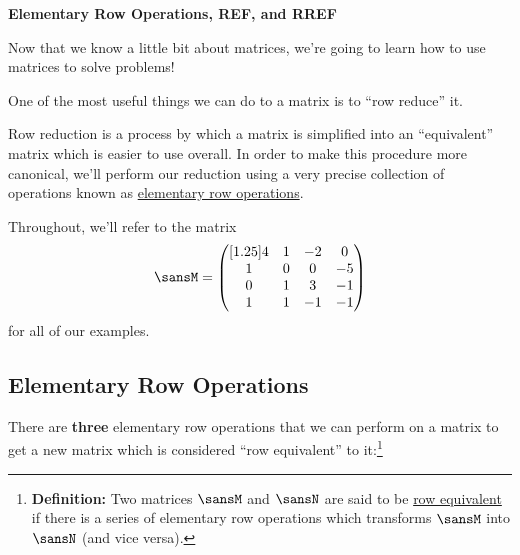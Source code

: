 \documentclass[12 pt]{article}
\newcommand{\pmat}[1]{\begin{pmatrix}[1.25]#1\end{pmatrix}}
\begin{document}
\begin{center}
\Large{\textbf{Elementary Row Operations, REF, and RREF}}
\end{center}

Now that we know a little bit about matrices, we're going to learn how to use matrices to solve problems!

One of the most useful things we can do to a matrix is to ``row reduce'' it. 

Row reduction is a process by which a matrix is simplified into an ``equivalent'' matrix which is easier to use overall. In order to make this procedure more canonical, we'll perform our reduction using a very precise collection of operations known as \ul{elementary row operations}.

Throughout, we'll refer to the matrix
\[
\sansM=\pmat{4 & 1 & -2 & 0 \\ 1 & 0 & 0 & -5 \\ 0 & 1 & 3 & -1 \\ 1 & 1 & -1 & -1}
\]
for all of our examples.

\subsection*{Elementary Row Operations}
There are \textbf{three} elementary row operations that we can perform on a matrix to get a new matrix which is considered ``row equivalent'' to it:\footnote{\textbf{Definition:} Two matrices $\sansM$ and $\sansN$ are said to be \ul{row equivalent} if there is a series of elementary row operations which transforms $\sansM$ into $\sansN$ (and vice versa).} 
\end{document}
